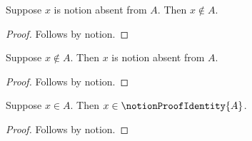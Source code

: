 \begin{proposition}\label{notion_proof_absent_expansion}
    Suppose $x$ is notion absent from $A$.
    Then $x\notin A$.
\end{proposition}
\begin{proof}
    Follows by notion.
\end{proof}

\begin{proposition}\label{notion_proof_absent_abbreviation_goal}
    Suppose $x\notin A$.
    Then $x$ is notion absent from $A$.
\end{proposition}
\begin{proof}
    Follows by notion.
\end{proof}

\begin{proposition}\label{notion_proof_identity_expansion}
    Suppose $x\in A$.
    Then $x\in\notionProofIdentity{A}$.
\end{proposition}
\begin{proof}
    Follows by notion.
\end{proof}
